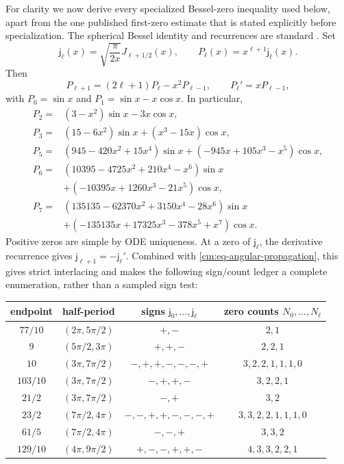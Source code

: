 \documentclass[11pt]{article}
\numberwithin{equation}{section}
\theoremstyle{definition}
\theoremstyle{remark}
\begin{document}
For clarity we now derive every specialized Bessel-zero inequality used
below, apart from the one published first-zero estimate that is stated
explicitly before specialization.  The spherical Bessel identity and
recurrences are standard \cite{DLMF}.  Set
\[
 \mathsf j_\ell(x)=\sqrt{\frac{\pi}{2x}}J_{\ell+1/2}(x),
 \qquad
 P_\ell(x)=x^{\ell+1}\mathsf j_\ell(x).
\]
Then
\begin{equation}
 P_{\ell+1}=(2\ell+1)P_\ell-x^2P_{\ell-1},
 \qquad P_\ell'=xP_{\ell-1},
 \label{cm:eq-P-recurrence}
\end{equation}
with \(P_0=\sin x\) and \(P_1=\sin x-x\cos x\).  In particular,
\[
\begin{aligned}
P_2={}&(3-x^2)\sin x-3x\cos x,\\
P_3={}&(15-6x^2)\sin x+(x^3-15x)\cos x,\\
P_5={}&(945-420x^2+15x^4)\sin x
       +(-945x+105x^3-x^5)\cos x,\\
P_6={}&(10395-4725x^2+210x^4-x^6)\sin x\\
 &+(-10395x+1260x^3-21x^5)\cos x,\\
P_7={}&(135135-62370x^2+3150x^4-28x^6)\sin x\\
 &+(-135135x+17325x^3-378x^5+x^7)\cos x.
\end{aligned}
\]
Positive zeros are simple by ODE uniqueness.  At a zero of
\(\mathsf j_\ell\), the derivative recurrence gives
\(\mathsf j_{\ell+1}=-\mathsf j_\ell'\).  Combined with
\eqref{cm:eq-angular-propagation}, this gives strict interlacing and makes
the following sign/count ledger a complete enumeration, rather than a
sampled sign test:
\begin{center}
\small
\begin{tabular}{c|c|c|c}
endpoint & half-period & signs \(\mathsf j_0,\ldots,\mathsf j_\ell\)
& zero counts \(N_0,\ldots,N_\ell\)\\ \hline
\(77/10\)&\((2\pi,5\pi/2)\)&\(+,-\)&\(2,1\)\\
\(9\)&\((5\pi/2,3\pi)\)&\(+,+,-\)&\(2,2,1\)\\
\(10\)&\((3\pi,7\pi/2)\)&\(-,+,+,-,-,-,+\)&\(3,2,2,1,1,1,0\)\\
\(103/10\)&\((3\pi,7\pi/2)\)&\(-,+,+,-\)&\(3,2,2,1\)\\
\(21/2\)&\((3\pi,7\pi/2)\)&\(-,+\)&\(3,2\)\\
\(23/2\)&\((7\pi/2,4\pi)\)&\(-,-,+,+,-,-,-,+\)&\(3,3,2,2,1,1,1,0\)\\
\(61/5\)&\((7\pi/2,4\pi)\)&\(-,-,+\)&\(3,3,2\)\\
\(129/10\)&\((4\pi,9\pi/2)\)&\(+,-,-,+,+,-\)&\(4,3,3,2,2,1\)
\end{tabular}
\end{center}
\end{document}
